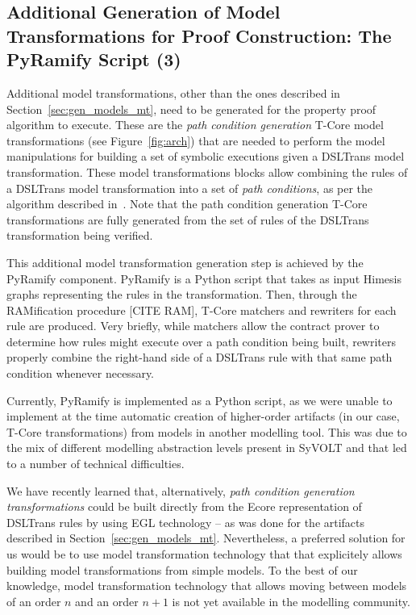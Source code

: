 

\subsection{Additional Generation of Model Transformations for Proof
Construction: The PyRamify Script (3)}

Additional model transformations, other than the ones described in
Section~\ref{sec:gen_models_mt}, need to be generated for the property proof
algorithm to execute. These are the \emph{path condition generation} T-Core
model transformations (see Figure~\ref{fig:arch}) that are needed to perform the
model manipulations for building a set of symbolic executions given a DSLTrans
model transformation. These model transformations blocks allow combining the rules of a DSLTrans model
transformation into a set of \emph{path conditions}, as per the algorithm
described in~\cite{Lucio2014}. Note that the path condition generation T-Core
transformations are fully generated from the set of rules of the DSLTrans
transformation being verified.

This additional model transformation generation step is achieved by the PyRamify
component. PyRamify is a Python script that takes as input Himesis graphs
representing the rules in the transformation. Then, through the RAMification
procedure [CITE RAM], T-Core matchers and rewriters for each rule are produced.
Very briefly, while matchers allow the contract prover to determine how
rules might execute over a path condition being built, rewriters properly
combine the right-hand side of a DSLTrans rule with that same path condition
whenever necessary.


Currently, PyRamify is implemented as a Python script, as we were unable to
implement at the time automatic creation of higher-order artifacts (in our
case, T-Core transformations) from models in another modelling tool.
This was due to the mix of different modelling abstraction levels present in
SyVOLT and that led to a number of technical difficulties.

We have recently learned that, alternatively, \emph{path condition generation
transformations} could be built directly from the Ecore representation of
DSLTrans rules by using EGL technology -- as was done for the artifacts
described in Section~\ref{sec:gen_models_mt}. Nevertheless, a preferred solution for us would
be to use model transformation technology that that explicitely allows
building model transformations from simple models. To the best of our knowledge,
model transformation technology that allows moving between models of an order 
$n$ and an order $n+1$ is not yet available in the modelling community.

